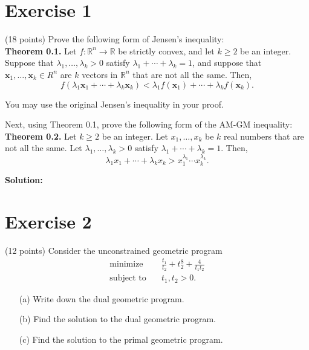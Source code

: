 \documentclass{article}
\begin{document}
\section*{Exercise 1}
(18 points) Prove the following form of Jensen's inequality: \\

\textbf{Theorem 0.1.} Let $f : \mathbb{R}^n \to \mathbb{R}$ be strictly convex, and let $k \geq 2$ be an integer. Suppose that $\lambda_1, \ldots, \lambda_k > 0$ satisfy $\lambda_1 + \cdots + \lambda_k = 1$, and suppose that $\mathbf{x}_1, \ldots, \mathbf{x}_k \in R^n$ are $k$ vectors in $\mathbb{R}^n$ that are not all the same. Then,
\[
f(\lambda_1 \mathbf{x}_1 + \cdots + \lambda_k \mathbf{x}_k) < \lambda_1 f(\mathbf{x}_1) + \cdots + \lambda_k f(\mathbf{x}_k).
\]

You may use the original Jensen's inequality in your proof.

Next, using Theorem 0.1, prove the following form of the AM-GM inequality: \\

\textbf{Theorem 0.2.} Let $k \geq 2$ be an integer. Let $x_1, \ldots, x_k$ be $k$ real numbers that are not all the same. Let $\lambda_1, \ldots, \lambda_k > 0$ satisfy $\lambda_1 + \cdots + \lambda_k = 1$. Then,
\[
\lambda_1 x_1 + \cdots + \lambda_k x_k > x_1^{\lambda_1} \cdots x_k^{\lambda_k}.
\]

\textbf{Solution:} \\



\newpage

\section*{Exercise 2}
(12 points) Consider the unconstrained geometric program
\begin{align}
\text{minimize} \quad & \frac{t_1}{t_2} + t_2^8 + \frac{4}{t_1 t_2} \\
\text{subject to} \quad & t_1, t_2 > 0.
\end{align}

\begin{itemize}
    \item[(a)] Write down the dual geometric program.
    \item[(b)] Find the solution to the dual geometric program.
    \item[(c)] Find the solution to the primal geometric program.
\end{itemize}
\end{document}
